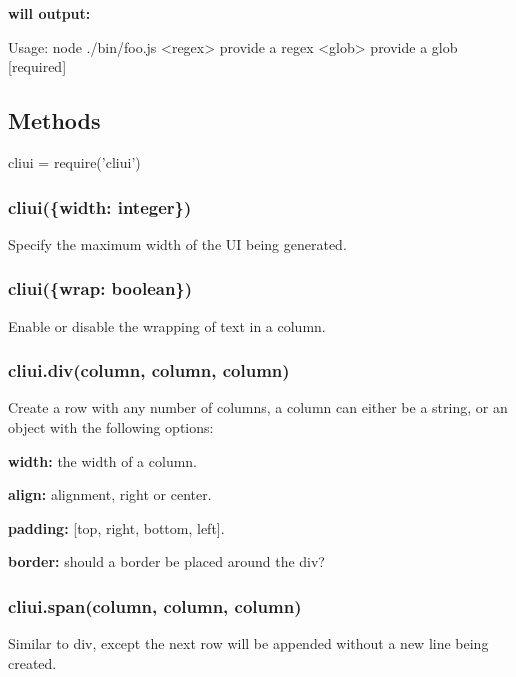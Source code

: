 {\bfseries will output\+:}


\begin{DoxyCode}
Usage: node ./bin/foo.js
  <regex>  provide a regex
  <glob>   provide a glob          [required]
\end{DoxyCode}


\subsection*{Methods}


\begin{DoxyCode}
cliui = require('cliui')
\end{DoxyCode}


\subsubsection*{cliui(\{width\+: integer\})}

Specify the maximum width of the UI being generated.

\subsubsection*{cliui(\{wrap\+: boolean\})}

Enable or disable the wrapping of text in a column.

\subsubsection*{cliui.\+div(column, column, column)}

Create a row with any number of columns, a column can either be a string, or an object with the following options\+:


\begin{DoxyItemize}
\item {\bfseries width\+:} the width of a column.
\item {\bfseries align\+:} alignment, {\ttfamily right} or {\ttfamily center}.
\item {\bfseries padding\+:} {\ttfamily \mbox{[}top, right, bottom, left\mbox{]}}.
\item {\bfseries border\+:} should a border be placed around the div?
\end{DoxyItemize}

\subsubsection*{cliui.\+span(column, column, column)}

Similar to {\ttfamily div}, except the next row will be appended without a new line being created. 